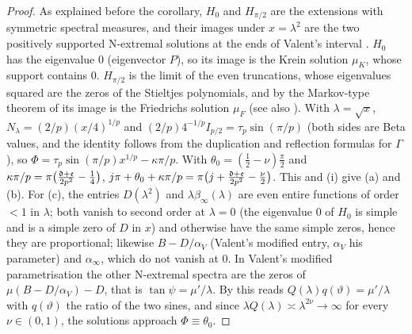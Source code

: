 \begin{proof}
As explained before the corollary, $H_0$ and $H_{\pi/2}$ are the extensions with symmetric spectral
measures, and their images under $x=\lambda^2$ are the two positively supported N-extremal solutions at
the ends of Valent's interval \cite{Chihara1982,Pedersen1995,Valent2006}. $H_0$ has the
eigenvalue $0$ (eigenvector $P$), so its image is the Krein solution $\mu_K$, whose
support contains $0$. $H_{\pi/2}$ is the limit of the even truncations, whose
eigenvalues squared are the zeros of the Stieltjes polynomials, and by the
Markov-type theorem of \cite[Prop.~5]{Valent2006} its image is the Friedrichs solution
$\mu_F$ (see also \cite{Pedersen1995}). With $\lambda=\sqrt x$,
$N_\lambda=(2/p)(x/4)^{1/p}$ and $(2/p)4^{-1/p}I_{p/2}=\tau_p\sin(\pi/p)$ (both sides are Beta values, and the
identity follows from the duplication and reflection formulas for $\Gamma$), so
$\Phi=\tau_p\sin(\pi/p)x^{1/p}-\kappa\pi/p$. With $\theta_0=(\frac12-\nu)\frac\pi2$ and
$\kappa\pi/p=\pi\bigl(\frac{\mathfrak d+\mathfrak e}{2p^2}-\frac14\bigr)$,
$j\pi+\theta_0+\kappa\pi/p=\pi\bigl(j+\frac{\mathfrak d+\mathfrak e}{2p^2}-\frac\nu2\bigr)$. This and (i) give
(a) and (b). For (c), the entries $D(\lambda^2)$ and $\lambda\beta_\infty(\lambda)$ are even entire functions
of order $<1$ in $\lambda$; both vanish to second order at $\lambda=0$ (the eigenvalue $0$ of $H_0$ is simple
and is a simple zero of $D$ in $x$) and otherwise have the same simple zeros, hence they are
proportional; likewise $B-D/\alpha_V$ (Valent's modified entry, $\alpha_V$ his parameter) and
$\alpha_\infty$, which do not vanish at $0$. In Valent's modified
parametrisation \cite[eq.~(54)]{Valent2006} the other N-extremal spectra are the
zeros of $\mu(B-D/\alpha_V)-D$, that is $\tan\psi=\mu'/\lambda$. By  this reads
$Q(\lambda)q(\vartheta)=\mu'/\lambda$ with $q(\vartheta)$ the ratio of the two sines, and since
$\lambda Q(\lambda)\asymp\lambda^{2\nu}\to\infty$ for every $\nu\in(0,1)$, the solutions approach
$\Phi\equiv\theta_0$.
\end{proof}

